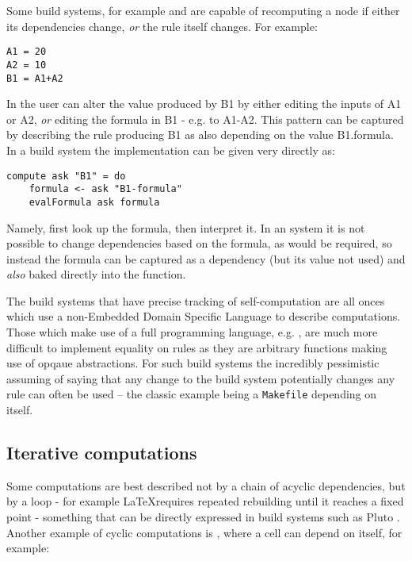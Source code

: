 Some build systems, for example \Excel and \Ninja are capable of recomputing a node if either its dependencies change, \textit{or} the rule itself changes. For example:

\begin{verbatim}
A1 = 20
A2 = 10
B1 = A1+A2
\end{verbatim}

In \Excel the user can alter the value produced by \textsf{B1} by either editing the inputs of \textsf{A1} or \textsf{A2}, \textit{or} editing the formula in \textsf{B1} - e.g. to \textsf{A1-A2}. This pattern can be captured by describing the rule producing \textsf{B1} as also depending on the value \textsf{B1.formula}. In a  build system the implementation can be given very directly as:

\begin{verbatim}
compute ask "B1" = do
    formula <- ask "B1-formula"
    evalFormula ask formula
\end{verbatim}

Namely, first look up the formula, then interpret it. In an  system it is not possible to change dependencies based on the formula, as would be required, so instead the formula can be captured as a dependency (but its value not used) and \textit{also} baked directly into the  function.

The build systems that have precise tracking of self-computation are all onces which use a non-Embedded Domain Specific Language to describe computations. Those which make use of a full programming language, e.g. \Shake, are much more difficult to implement equality on rules as they are arbitrary functions making use of opqaue abstractions. For such build systems the incredibly pessimistic assuming of saying that any change to the build system potentially changes any rule can often be used -- the classic example being a \texttt{Makefile} depending on itself.

\subsection{Iterative computations}\label{sec-iterative-compute}

Some computations are best described not by a chain of acyclic dependencies, but by a loop - for example \LaTeX requires repeated rebuilding until it reaches a fixed point - something that can be directly expressed in build systems such as Pluto \cite{pluto}. Another example of cyclic computations is \Excel, where a cell can depend on itself, for example:

